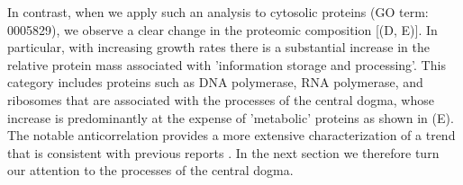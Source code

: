 In contrast, when we apply such an analysis to cytosolic proteins
(GO term: 0005829), we observe a clear change in the proteomic composition
[(D, E)]. In particular, with increasing growth rates there
is a substantial increase in the relative protein mass associated with
'information storage and processing'. This category includes proteins such as
DNA polymerase, RNA polymerase, and ribosomes that are associated with the
processes of the central dogma, whose increase is predominantly at the expense
of 'metabolic' proteins as shown in (E). The notable
anticorrelation  provides a more extensive characterization of a trend that is
consistent with previous reports \citep{scott2010, hui2015, zhu2019}. In the
next section we therefore turn our attention to the processes of the central
dogma.

